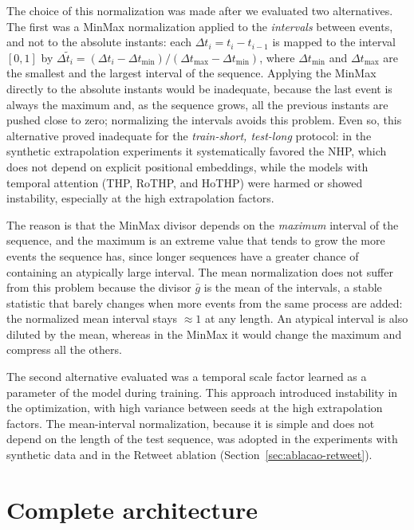 The choice of this normalization was made after we evaluated two alternatives. The first was a MinMax normalization applied to the \emph{intervals} between events, and not to the absolute instants: each $\Delta t_i = t_i - t_{i-1}$ is mapped to the interval $[0, 1]$ by $\Delta\tilde{t}_i = (\Delta t_i - \Delta t_{\min}) / (\Delta t_{\max} - \Delta t_{\min})$, where $\Delta t_{\min}$ and $\Delta t_{\max}$ are the smallest and the largest interval of the sequence. Applying the MinMax directly to the absolute instants would be inadequate, because the last event is always the maximum and, as the sequence grows, all the previous instants are pushed close to zero; normalizing the intervals avoids this problem. Even so, this alternative proved inadequate for the \textit{train-short, test-long} protocol: in the synthetic extrapolation experiments it systematically favored the NHP, which does not depend on explicit positional embeddings, while the models with temporal attention (THP, RoTHP, and HoTHP) were harmed or showed instability, especially at the high extrapolation factors.

The reason is that the MinMax divisor depends on the \emph{maximum} interval of the sequence, and the maximum is an extreme value that tends to grow the more events the sequence has, since longer sequences have a greater chance of containing an atypically large interval. The mean normalization does not suffer from this problem because the divisor $\bar{g}$ is the mean of the intervals, a stable statistic that barely changes when more events from the same process are added: the normalized mean interval stays $\approx 1$ at any length. An atypical interval is also diluted by the mean, whereas in the MinMax it would change the maximum and compress all the others.


The second alternative evaluated was a temporal scale factor learned as a parameter of the model during training. This approach introduced instability in the optimization, with high variance between seeds at the high extrapolation factors. The mean-interval normalization, because it is simple and does not depend on the length of the test sequence, was adopted in the experiments with synthetic data and in the Retweet ablation (Section~\ref{sec:ablacao-retweet}).

\section{Complete architecture}
\label{sec:arquitetura-hothp}


